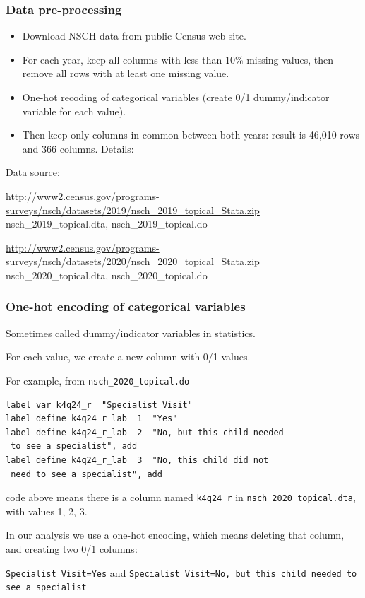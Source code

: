 \documentclass{beamer}
\begin{document}
\begin{frame}
  \frametitle{Data pre-processing}

  \begin{itemize}
  \item Download NSCH data from public Census web site.
  \item For each year, keep all columns with less than
    10\% missing values, then remove all rows with at least one missing value.
  \item One-hot recoding of categorical variables (create 0/1
    dummy/indicator variable for each value).
  \item Then keep only columns in common between both years: result is
    46,010 rows and 366 columns. Details:
  \end{itemize}

  \scriptsize
  
   

Data source:

\url{http://www2.census.gov/programs-surveys/nsch/datasets/2019/nsch_2019_topical_Stata.zip} nsch\_2019\_topical.dta, nsch\_2019\_topical.do

\url{http://www2.census.gov/programs-surveys/nsch/datasets/2020/nsch_2020_topical_Stata.zip} nsch\_2020\_topical.dta, nsch\_2020\_topical.do

\end{frame} 

\begin{frame}[fragile]
  \frametitle{One-hot encoding of categorical variables}

Sometimes called dummy/indicator variables in statistics. 

For each value, we create a new column with 0/1 values.

For example, from \verb|nsch_2020_topical.do|
\begin{verbatim}
label var k4q24_r  "Specialist Visit"
label define k4q24_r_lab  1  "Yes"
label define k4q24_r_lab  2  "No, but this child needed 
 to see a specialist", add
label define k4q24_r_lab  3  "No, this child did not 
 need to see a specialist", add
\end{verbatim}
code above means there is a column named \verb|k4q24_r| in \verb|nsch_2020_topical.dta|, with values 1, 2, 3.

In our analysis we use a one-hot encoding, which means deleting that
column, and creating two 0/1 columns:

\small
\verb|Specialist Visit=Yes| and
\verb|Specialist Visit=No, but this child needed to see a specialist|

\end{frame}
\end{document}
